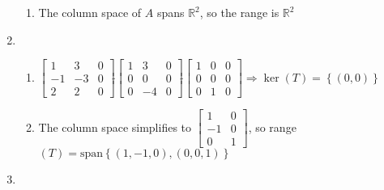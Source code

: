 \documentclass[12pt]{article}
\begin{document}
\begin{enumerate}
\begin{enumerate}
      \item The column space of $A$ spans $\mathbb{R}^2$, so the range is $\mathbb{R}^2$

    \end{enumerate}

    \setcounter{enumi}{14}

  \item

    \begin{enumerate}

      \item $\left[ \begin{array}{cc|c} 1 & 3 & 0\\ -1 & -3 & 0\\ 2 & 2 & 0\end{array} \right]\widetilde{ }\left[ \begin{array}{cc|c} 1 & 3 & 0\\ 0 & 0 & 0\\ 0 & -4 & 0  \end{array} \right]\widetilde{ }\left[ \begin{array}{cc|c} 1 & 0 & 0\\ 0 & 0 & 0\\ 0 & 1 & 0\end{array} \right]\Rightarrow\ker(T)=\left\{ (0,0) \right\}$

      \item The column space simplifies to $\left[ \begin{array}{cc} 1 & 0\\ -1 & 0\\ 0 & 1\end{array} \right]$, so range$(T)=\text{span}\left\{ (1,-1,0),(0,0,1) \right\}$

    \end{enumerate}

    \setcounter{enumi}{16}

  \item

    \begin{enumerate}


\end{enumerate}
\end{enumerate}
\end{document}
